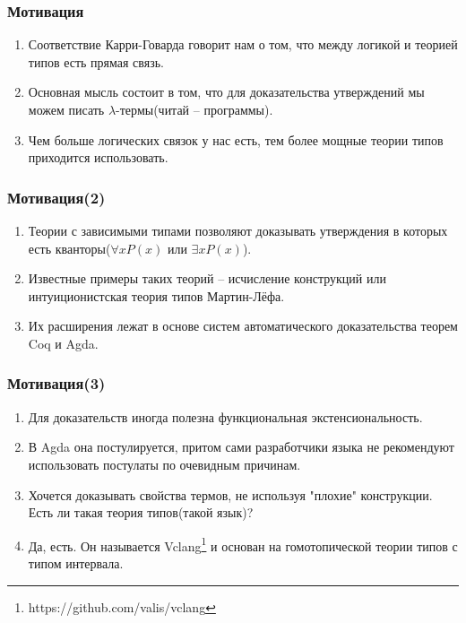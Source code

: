 \documentclass{beamer}
\begin{document}
\begin{frame}\frametitle{Мотивация}
    \begin{enumerate}
        \item Соответствие Карри-Говарда говорит нам о том, что между логикой и теорией типов есть прямая связь.
        \item Основная мысль состоит в том, что для доказательства утверждений мы можем писать $\lambda$-термы(читай -- программы).
        \item Чем больше логических связок у нас есть, тем более мощные теории типов приходится использовать.
    \end{enumerate}
\end{frame}


\begin{frame}\frametitle{Мотивация(2)}
    \begin{enumerate}
        \item Теории с зависимыми типами позволяют доказывать утверждения в которых есть кванторы($\forall x P(x)$ или $\exists x P(x)$).
        \item Известные примеры таких теорий -- исчисление конструкций или интуиционистская теория типов Мартин-Лёфа.
        \item Их расширения лежат в основе систем автоматического доказательства теорем Coq и Agda.
    \end{enumerate}
\end{frame}


\begin{frame}\frametitle{Мотивация(3)}
    \begin{enumerate}
        \item Для доказательств иногда полезна функциональная экстенсиональность.
        \item В Agda она постулируется, притом сами разработчики языка не рекомендуют использовать постулаты по очевидным причинам.
        \item Хочется доказывать свойства термов, не используя "плохие" конструкции. Есть ли такая теория типов(такой язык)?
        \item <2-> Да, есть. Он называется Vclang\footnote{https://github.com/valis/vclang} и основан на гомотопической теории типов с типом интервала. 
    \end{enumerate}
\end{frame}
\end{document}
